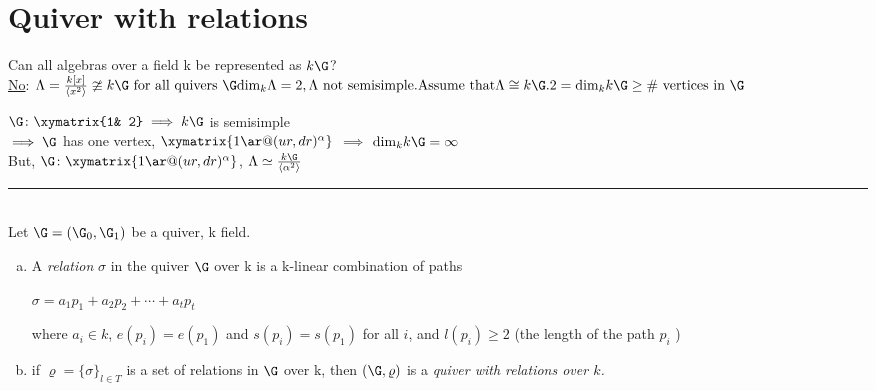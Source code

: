 
\section{Quiver with relations}
Can all algebras over a field k be represented as $k\G$?\\\newline
\underline{No}: 
$\Lambda = \frac{k[x]}{\langle x^2\rangle} \ncong k\G \text{ for all quivers }\G
\text{dim}_{k}\Lambda = 2, \Lambda\text{ not semisimple}.\\\newline \text{Assume that}  \Lambda \cong k\G.\\
2= \text{dim}_kk\G \ge \text{\# vertices in } \G $

$ \G \colon \xymatrix{1& 2} \implies k\G$ is semisimple \blitza\\
$\implies \G$ has one vertex, $\xymatrix{1\ar@(ur,dr)^\alpha} $ $\implies$ $\text{dim}_kk\G = \infty$ \blitza\\
\newline But, $\G\colon \xymatrix{1 \ar@(ur,dr)^\alpha}$, $\Lambda \simeq \frac{k\G}{\langle \alpha^2\rangle} $\\
\rule{\textwidth}{1pt}\\
Let $\G=(\G_0,\G_1)$ be a quiver, k field.\\
\begin{defin}
\begin{enumerate}[(a)]
	~\\ \item A \emph{relation} $\sigma$ in the quiver $\G$ over k is a k-linear combination of paths
	\begin{center}
		$\sigma = a_1p_1 + a_2p_2+ \cdots + a_tp_t$\\
	\end{center}
	where $a_i\in k$, $e(p_i)=e(p_1)$ and $s(p_i)=s(p_1)$ for all $i$, and $l(p_i)\geq 2$ (the length of the path $p_i$ )
	\item if $\varrho = \{\sigma\}_{l \in T}$ is a set of relations in $\G$ over k, then $(\G,\varrho)$ is a \emph{quiver with relations over $k$.}  
\end{enumerate}
\end{defin}
